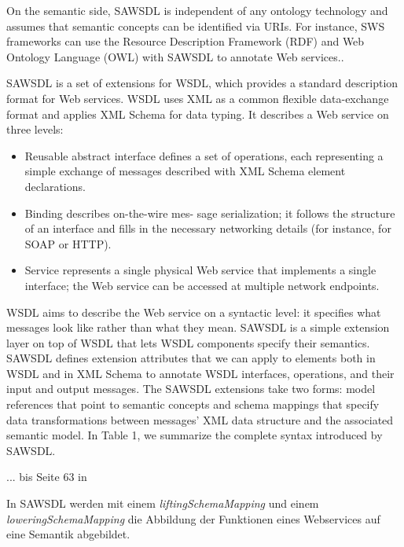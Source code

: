 On the semantic side, SAWSDL is independent
of any ontology technology
and assumes that semantic concepts
can be identified via URIs. For instance,
SWS frameworks can use the Resource
Description Framework (RDF) and Web
Ontology Language (OWL) with SAWSDL
to annotate Web services..\cite[S.61]{ky-sawsdl}

SAWSDL is a set of extensions for
WSDL, which provides a standard
description format for Web services.
WSDL uses XML as a common flexible
data-exchange format and applies
XML Schema for data typing. It
describes a Web service on three levels:
\begin{itemize}
\item Reusable abstract interface defines
a set of operations, each representing
a simple exchange of messages
described with XML Schema element
declarations.
\item  Binding describes on-the-wire mes-
sage serialization; it follows the
structure of an interface and fills in
the necessary networking details
(for instance, for SOAP or HTTP).
\item Service represents a single physical
Web service that implements a single
interface; the Web service can
be accessed at multiple network
endpoints.
\end{itemize}

WSDL aims to describe the Web
service on a syntactic level: it specifies
what messages look like rather
than what they mean. SAWSDL is a
simple extension layer on top of
WSDL that lets WSDL components
specify their semantics. SAWSDL
defines extension attributes that we
can apply to elements both in WSDL
and in XML Schema to annotate
WSDL interfaces, operations, and their
input and output messages.
The SAWSDL extensions take two
forms: model references that point to
semantic concepts and schema mappings
that specify data transformations
between messages’ XML data
structure and the associated semantic
model. In Table 1, we summarize
the complete syntax introduced by
SAWSDL.

... bis Seite 63 in \cite{ky-sawsdl}

In \ac{SAWSDL} werden mit einem \emph{liftingSchemaMapping} und einem \emph{loweringSchemaMapping} die Abbildung der Funktionen eines Webservices auf eine Semantik abgebildet.

